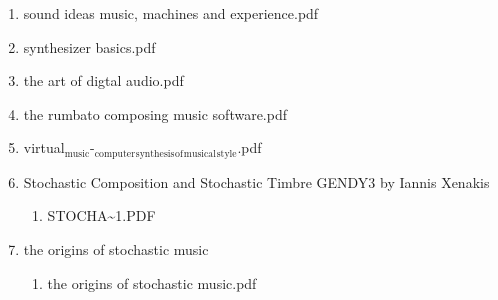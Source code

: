 \documentclass[11pt]{article}
\begin{document}
\begin{enumerate}
\item sound ideas music, machines and experience.pdf
\label{sec-1-1-1-1-11-19-25-32}

\item synthesizer basics.pdf
\label{sec-1-1-1-1-11-19-25-33}

\item the art of digtal audio.pdf
\label{sec-1-1-1-1-11-19-25-34}

\item the rumbato composing music software.pdf
\label{sec-1-1-1-1-11-19-25-35}

\item virtual$_{\text{music}}$-$_{\text{computer}}$$_{\text{synthesis}}$$_{\text{of}}$$_{\text{musical}}$$_{\text{style}}$.pdf
\label{sec-1-1-1-1-11-19-25-36}

\item Stochastic Composition and Stochastic Timbre GENDY3 by Iannis Xenakis
\label{sec-1-1-1-1-11-19-25-37}
\begin{enumerate}
\item STOCHA\textasciitilde{}1.PDF
\label{sec-1-1-1-1-11-19-25-37-1}
\end{enumerate}

\item the origins of stochastic music
\label{sec-1-1-1-1-11-19-25-38}
\begin{enumerate}
\item the origins of stochastic music.pdf
\label{sec-1-1-1-1-11-19-25-38-1}
\end{enumerate}
\end{enumerate}
\end{document}
